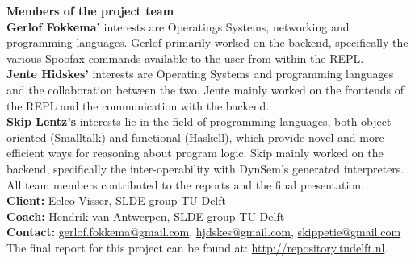 \noindent\textbf{Members of the project team}\\
\textbf{Gerlof Fokkema'} interests are Operatings Systems, networking and
programming languages. Gerlof primarily worked on the backend, specifically the
various Spoofax commands available to the user from within the REPL.\\
\textbf{Jente Hidskes'} interests are Operating Systems and programming
languages and the collaboration between the two. Jente mainly worked
on the frontends of the REPL and the communication with the backend.\\
\textbf{Skip Lentz's} interests lie in the field of programming languages,
both object-oriented (Smalltalk) and functional (Haskell), which provide
novel and more efficient ways for reasoning about program logic. Skip mainly
worked on the backend, specifically the inter-operability with DynSem's
generated interpreters.\\

\noindent All team members contributed to the reports and the final
presentation.\\

\noindent\textbf{Client:} Eelco Visser, SLDE group TU Delft\\
\textbf{Coach:} Hendrik van Antwerpen, SLDE group TU Delft\\
\textbf{Contact:}
\href{mailto:gerlof.fokkema@gmail.com}{gerlof.fokkema@gmail.com},
\href{mailto:hjdskes@gmail.com}{hjdskes@gmail.com},
\href{mailto:skippetie@gmail.com}{skippetie@gmail.com}\\

\noindent The final report for this project can be found at: \url{http://repository.tudelft.nl}.

